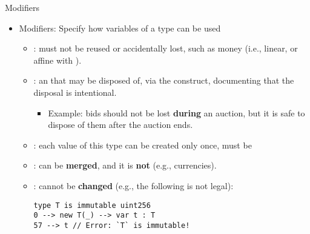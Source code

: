 \documentclass[leqno,presentation,usenames,dvipsnames]{beamer}
\begin{document}
\begin{frame}[fragile]{Modifiers}
    \begin{itemize}
        \item Modifiers: Specify how variables of a type can be used
        \begin{itemize}
            \item {}: must not be reused or accidentally lost, such as money (i.e., linear, or affine with ).
            \item {}: an  that may be disposed of, via the  construct, documenting that the disposal is intentional.
                \begin{itemize}
                    \item Example: bids should not be lost \textbf{during} an auction, but it is safe to dispose of them after the auction ends.
                \end{itemize}
            \item {}: each value of this type can be created only once, must be 
            \item {}: can be \textbf{merged}, and it is \textbf{not}  (e.g., currencies).
            \item {}: cannot be \textbf{changed} (e.g., the following is not legal):
\begin{lstlisting}[language=flow, xleftmargin=0.4em, basicstyle=\footnotesize\ttfamily]
type T is immutable uint256
0 --> new T(_) --> var t : T
57 --> t // Error: `T` is immutable!
\end{lstlisting}
        \end{itemize}
    \end{itemize}
\end{frame}
\end{document}
